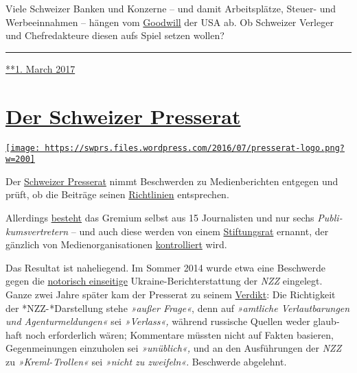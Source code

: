 Viele Schwei­zer Banken und Konzerne -- und da­mit Ar­beits­plätze,
Steuer- und Werbe­ein­nah­men -- hän­gen vom
\href{http://www.finews.ch/news/finanzplatz/21359-us-steuerstreit-kategorie-2-kategorie-1-lombard-odier-julius-b\%C3\%A4r-department-of-justice}{Good­will}
der USA ab. Ob Schweizer Ver­le­ger und Chef­re­dak­teure diesen aufs
Spiel setzen wollen?

\begin{center}\rule{0.5\linewidth}{\linethickness}\end{center}

\href{https://swprs.org/2017/03/01/abschied-von-usa-kritikern/}{**1.
March 2017}

\hypertarget{der-schweizer-presserat}{%
\section{\texorpdfstring{\href{https://swprs.org/2017/03/01/der-schweizer-presserat/}{Der
Schweizer
Presserat}}{Der Schweizer Presserat}}\label{der-schweizer-presserat}}

\href{https://swprs.org/2017/03/01/der-schweizer-presserat/}{\texttt{[image: https://swprs.files.wordpress.com/2016/07/presserat-logo.png?w=200]}}

Der \href{https://presserat.ch/}{Schweizer Presse­rat} nimmt
Be­schwer­den zu Me­dien­be­rich­ten ent­ge­gen und prüft, ob die
Beiträge seinen
\href{https://presserat.ch/journalistenkodex/richtlinien/}{Richt­linien}
ent­spre­chen.

Aller­dings
\href{https://presserat.ch/der-presserat/presseratsmitglieder/}{besteht}
das Gre­mium selbst aus 15 Jour­na­listen und nur sechs
\emph{Pub­li­kums­ver­tre­tern} -- und auch diese werden von einem
\href{https://presserat.ch/der-presserat/stiftungsratsmitglieder/}{Stif‌­tungs­rat}
er­nannt, der gänz­lich von Medien­orga­ni­sa­tionen
\href{https://presserat.ch/der-presserat/geschaeftsreglement/}{kon­trol­liert}
wird.

Das Resultat ist naheliegend. Im Som­mer 2014 wurde etwa eine
Be­schwerde gegen die
\href{https://swprs.org/die-nzz-studie/}{no­to­risch ein­sei­tige}
Ukraine-Bericht­er­stattung der \emph{NZZ} ein­ge­legt. Ganze zwei Jahre
später kam der Presse­rat zu seinem
\href{https://presserat.ch/complaints/wahrheitspflicht-kommentarfreiheit-unterschlagen-wichtiger-informationen-entstellen-von-tatsachen/}{Verdikt}:
Die Rich­tig­keit der *NZZ- *Dar­stel­lung stehe \emph{»außer Frage«},
denn auf \emph{»amt­liche Ver­laut­ba­rungen und Agen­tur­mel­dungen«}
sei \emph{»Verlass«,} während russische Quel­len weder glaub­haf‌t noch
erforderlich wären; Kom­men­tare müss­ten nicht auf Fak­ten ba­sie­ren,
Ge­gen­mei­nungen ein­zu­holen sei \emph{»un­üb­lich«,} und an den
Aus­füh­rungen der \emph{NZZ} zu \emph{»Kreml- Trollen«} sei
\emph{»nicht zu zwei­feln«}. Be­schwerde ab­ge­lehnt.

